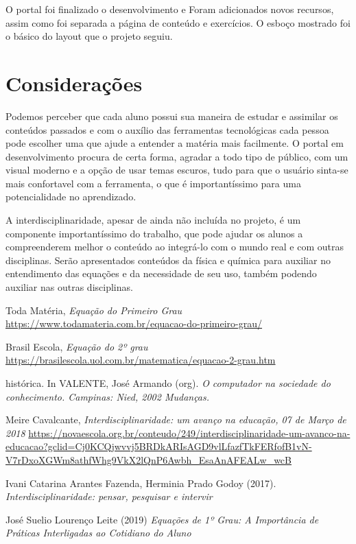 \documentclass[12pt]{report}
\begin{document}
O portal foi finalizado o desenvolvimento e Foram adicionados novos recursos, assim como foi separada a página de conteúdo e exercícios. O esboço mostrado foi o básico do layout que o projeto seguiu.

\chapter{Considerações}
Podemos perceber que cada aluno possui sua maneira de estudar e assimilar os conteúdos passados e com o auxílio das ferramentas tecnológicas cada pessoa pode escolher uma que ajude a entender a matéria mais facilmente. O portal em desenvolvimento procura de certa forma, agradar a todo tipo de público, com um visual moderno e a opção de usar temas escuros, tudo para que o usuário sinta-se mais confortavel com a ferramenta, o que é importantíssimo para uma potencialidade no aprendizado.

A interdisciplinaridade, apesar de ainda não incluída no projeto, é um componente importantíssimo do trabalho, que pode ajudar os alunos a compreenderem melhor o conteúdo ao integrá-lo com o mundo real e com outras disciplinas. Serão apresentados conteúdos da física e química para auxiliar no entendimento das equações e da necessidade de seu uso, também podendo auxiliar nas outras disciplinas.

\begin{thebibliography}{9}

\noindent Toda Matéria, 
\textit{Equação do Primeiro Grau}
\url{https://www.todamateria.com.br/equacao-do-primeiro-grau/}

\noindent Brasil Escola, 
\textit{Equação do 2º grau}
\url{https://brasilescola.uol.com.br/matematica/equacao-2-grau.htm}

\noindent histórica. In VALENTE, José Armando (org). 
\textit{O computador na sociedade do conhecimento. Campinas: Nied, 2002 Mudanças.}

\noindent Meire Cavalcante,
\textit{Interdisciplinaridade: um avanço na educação, 07 de Março de 2018}
\url{https://novaescola.org.br/conteudo/249/interdisciplinaridade-um-avanco-na-educacao?gclid=Cj0KCQjwvvj5BRDkARIsAGD9vlLfazfTkFERfofB1vN-V7rDxoXGWm8athfWhg9VkX2lQnP6Awbh_EsaAnAFEALw_wcB}

\noindent Ivani Catarina Arantes Fazenda, Herminia Prado Godoy (2017).
\textit{Interdisciplinaridade: pensar, pesquisar e intervir}

\noindent José Suelio Lourenço Leite (2019)
\textit{Equações de 1º Grau: A Importância de Práticas Interligadas ao Cotidiano do Aluno}

\end{thebibliography}
\end{document}
